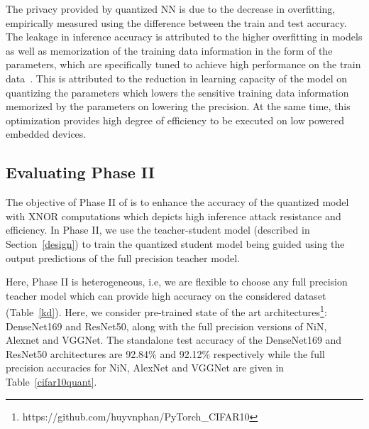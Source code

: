 The privacy provided by quantized NN is due to the decrease in overfitting, empirically measured using the difference between the train and test accuracy.
The leakage in inference accuracy is attributed to the higher overfitting in models as well as memorization of the training data information in the form of the parameters, which are specifically tuned to achieve high performance on the train data~\cite{10.1145/3133956.3134077,236216,DBLP:journals/corr/abs-1812-00910}.
This is attributed to the reduction in learning capacity of the model on quantizing the parameters which lowers the sensitive training data information memorized by the parameters on lowering the precision.
At the same time, this optimization provides high degree of efficiency to be executed on low powered embedded devices.

\subsection{Evaluating Phase II}

The objective of Phase II of \method\hspace{0.02in} is to enhance the accuracy of the quantized model with XNOR computations which depicts high inference attack resistance and efficiency.
In Phase II, we use the teacher-student model (described in Section~\ref{design}) to train the quantized student model being guided using the output predictions of the full precision teacher model.

Here, Phase II is heterogeneous, i.e, we are flexible to choose any full precision teacher model which can provide high accuracy on the considered dataset (Table~\ref{kd}).
Here, we consider pre-trained state of the art architectures\footnote{https://github.com/huyvnphan/PyTorch\_CIFAR10}: DenseNet169 and ResNet50, along with the full precision versions of NiN, Alexnet and VGGNet.
The standalone test accuracy of the DenseNet169 and ResNet50 architectures are 92.84\% and 92.12\% respectively while the full precision accuracies for NiN, AlexNet and VGGNet are given in Table~\ref{cifar10quant}.


